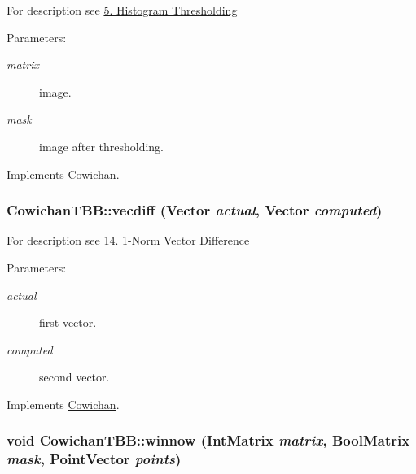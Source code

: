 For description see \hyperlink{index_thresh_sec}{5. Histogram Thresholding} \begin{Desc}
\item[Parameters:]
\begin{description}
\item[{\em matrix}]image. \item[{\em mask}]image after thresholding. \end{description}
\end{Desc}


Implements \hyperlink{class_cowichan_a0b633b8c1f21884e0998a9c7020c08c}{Cowichan}.\hypertarget{class_cowichan_t_b_b_28c976743df231fd183e4db9306050b1}{
\subsubsection[{vecdiff}]{ CowichanTBB::vecdiff ({\bf Vector} {\em actual}, \/  {\bf Vector} {\em computed})}}
\label{class_cowichan_t_b_b_28c976743df231fd183e4db9306050b1}


For description see \hyperlink{index_vecdiff_sec}{14. 1-Norm Vector Difference} \begin{Desc}
\item[Parameters:]
\begin{description}
\item[{\em actual}]first vector. \item[{\em computed}]second vector. \end{description}
\end{Desc}


Implements \hyperlink{class_cowichan_775d72b5e7d122f9f32555352278250e}{Cowichan}.\hypertarget{class_cowichan_t_b_b_77178470ef780e0505137dc1d22a85a2}{
\subsubsection[{winnow}]{\setlength{\rightskip}{0pt plus 5cm}void CowichanTBB::winnow ({\bf IntMatrix} {\em matrix}, \/  {\bf BoolMatrix} {\em mask}, \/  {\bf PointVector} {\em points})}}
\label{class_cowichan_t_b_b_77178470ef780e0505137dc1d22a85a2}


